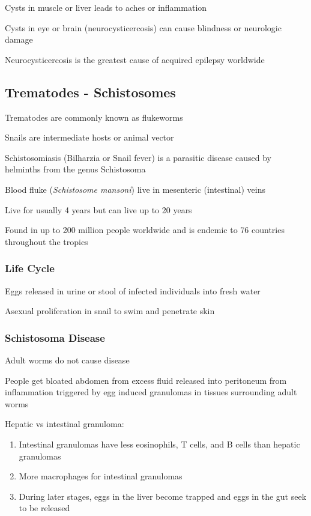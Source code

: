 \documentclass{notes}
\begin{document}
Cysts in muscle or liver leads to aches or inflammation

Cysts in eye or brain (neurocysticercosis) can cause blindness or neurologic damage

\tab \indicates Neurocysticercosis is the greatest cause of acquired epilepsy worldwide

\subsection*{Trematodes - Schistosomes}

Trematodes are commonly known as flukeworms

Snails are intermediate hosts or animal vector

Schistosomiasis (Bilharzia or Snail fever) is a parasitic disease caused by helminths from the genus Schistosoma

Blood fluke (\textit{Schistosome mansoni}) live in mesenteric (intestinal) veins

\tab \indicates Live for usually 4 years but can live up to 20 years

Found in up to 200 million people worldwide and is endemic to 76 countries throughout the tropics

\subsubsection*{Life Cycle}
Eggs released in urine or stool of infected individuals into fresh water

Asexual proliferation in snail to swim and penetrate skin

\subsubsection*{Schistosoma Disease}
Adult worms do not cause disease

People get bloated abdomen from excess fluid released into peritoneum from inflammation triggered by egg induced granulomas in tissues surrounding adult worms

Hepatic vs intestinal granuloma:
\begin{enumerate}
    \item Intestinal granulomas have less eosinophils, T cells, and B cells than hepatic granulomas
    \item More macrophages for intestinal granulomas
    \item During later stages, eggs in the liver become trapped and eggs in the gut seek to be released
\end{enumerate}
\end{document}
